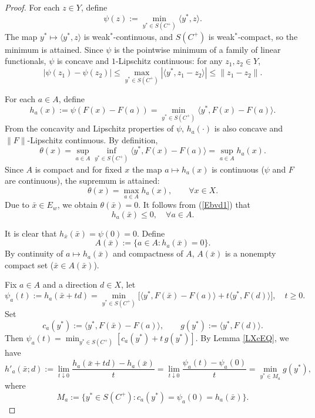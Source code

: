 \documentclass[11pt]{article}
\begin{document}
\begin{proof}
	For each $z\in Y$, define
	\[
	\psi(z):=\min_{y^*\in S(C^+)}\langle y^*,z\rangle.
	\]
	The map $y^*\mapsto\langle y^*,z\rangle$ is weak$^*$-continuous, and $S(C^+)$ is weak$^*$-compact, so the minimum is attained.  Since $\psi$ is the pointwise minimum of a family of linear functionals, $\psi$  is  concave and $1$-Lipschitz continuous: for any $z_1,z_2\in Y$,
	\[
	|\psi(z_1)-\psi(z_2)|
	\le\max_{y^*\in S(C^+)}|\langle y^*,z_1-z_2\rangle|
	\le\|z_1-z_2\|.
	\]
	
 
	
	For each $a\in A$, define
	\[
	h_a(x):=\psi(F(x)-F(a))=\min_{y^*\in S(C^+)}\langle y^*,F(x)-F(a)\rangle.
	\]
	From the concavity and Lipschitz properties of $\psi$, $h_a\left( \cdot \right)$ is also concave and $\|F\|$-Lipschitz continuous. By definition,
	\[
	\theta(x)  = \sup_{a \in A} \inf_{y^* \in S(C^+)} \langle y^*, F(x) - F(a) \rangle =\sup_{a\in A}h_a(x).
	\]
	Since $A$ is compact and for fixed $x$ the map $a\mapsto h_a(x)$ is continuous ($\psi$ and $F$ are continuous), the supremum is attained:
\begin{equation}\label{Ebvd1}
	\theta(x)=\max_{a\in A}h_a(x),\qquad\forall x\in X.  
 \end{equation}
	Due to $\bar x\in E_w$, we obtain  $\theta(\bar x)=0$.  It follows from  (\ref{Ebvd1})  that
\begin{equation}\label{Ebvd+1}
h_a(\bar x)\le  0,  \quad  \forall  a\in A . 
  \end{equation}
 
 
 It is clear that $h_{\bar x}(\bar x)=\psi(0)=0$. Define
	\[
	A(\bar x):=\{a\in A:h_a(\bar x)=0\}.
	\]
	By continuity of $a\mapsto h_a(\bar x)$ and compactness of $A$, $A(\bar x)$ is a nonempty compact set ($\bar x\in A(\bar x)$).
	
 	Fix $a\in A$ and a direction $d\in X$, let
	\[
\psi_a(t):=h_a(\bar x+td)=\min_{y^*\in S(C^+)}\bigl[\langle y^*,F(\bar x)-F(a)\rangle+t\langle y^*,F(d)\rangle\bigr],\quad t\ge0.
	\]
	Set
	\[
	c_a(y^*):=\langle y^*,F(\bar x)-F(a)\rangle,\qquad g(y^*):=\langle y^*,F(d)\rangle.
	\]
	Then $\psi _a(t)=\min_{y^*\in S(C^+)}[c_a(y^*)+t\,g(y^*)]$.    By  Lemma   \ref{LXcEQ}, we have 
\begin{equation}\label{Ebvd2}
	h'_a(\bar x;d):=\lim_{t\downarrow0}\frac{h_a(\bar x+td)-h_a(\bar x)}{t}   =\lim_{t\downarrow0}\frac{\psi _a(t)-\psi_a(0)}{t} =\min_{y^*\in M_a}g(y^*),
 \end{equation}
	where
	\[
	M_a:=\{y^*\in S(C^+):c_a(y^*)=\psi_a(0)=h_a(\bar x)\}.
	\]
	

\end{proof}
\end{document}
